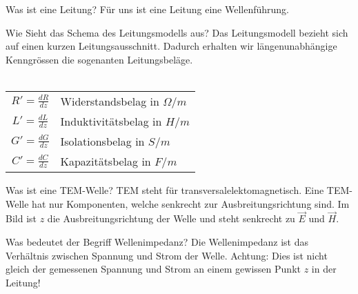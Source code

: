 
\begin{karte}{Was ist eine Leitung?}
	Für uns ist eine Leitung eine Wellenführung.\\
\end{karte}

\begin{karte}{Wie Sieht das Schema des Leitungsmodells aus?}
	Das Leitungsmodell bezieht sich auf einen kurzen Leitungsausschnitt. Dadurch erhalten wir längenunabhängige Kenngrössen die sogenanten Leitungsbeläge.\\
	\scalebox{.49}{}\\[5pt]
	\tiny
	\renewcommand\arraystretch{1.7}
	\begin{tabular}{cl}
		$R'=\frac{dR}{dz}$ & Widerstandsbelag in $\Omega/m$\\
		$L'=\frac{dL}{dz}$ & Induktivitätsbelag in $H/m$\\
		$G'=\frac{dG}{dz}$ & Isolationsbelag in $S/m$\\
		$C'=\frac{dC}{dz}$ & Kapazitätsbelag in $F/m$\\
	\end{tabular}
	\normalsize
\end{karte}

\begin{karte}{Was ist eine TEM-Welle?}
	TEM steht für transversalelektomagnetisch. Eine TEM-Welle hat nur Komponenten, welche senkrecht zur Ausbreitungsrichtung sind. Im Bild ist $z$ die Ausbreitungsrichtung der Welle und steht senkrecht zu $\vec{E}$ und $\vec{H}$. \\[10pt]
	
\end{karte}

\begin{karte}{Was bedeutet der Begriff Wellenimpedanz?}
	Die Wellenimpedanz ist das Verhältnis zwischen Spannung und Strom der Welle. Achtung: Dies ist nicht gleich der gemessenen Spannung und Strom an einem gewissen Punkt $z$ in der Leitung!\\[5pt]
	 
\end{karte}

